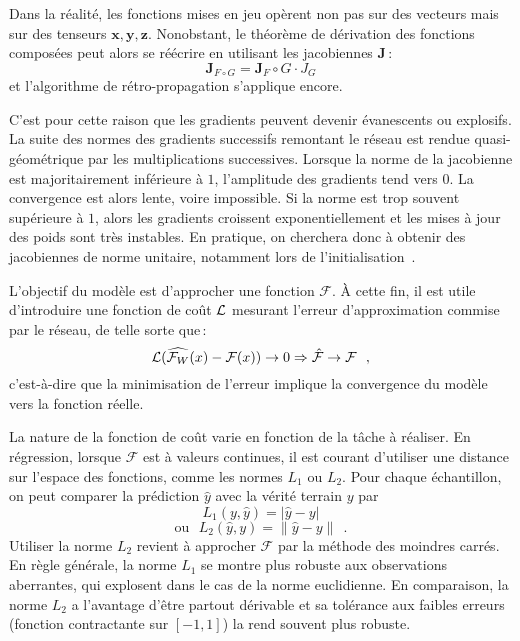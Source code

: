 Dans la réalité, les fonctions mises en jeu opèrent non pas sur des vecteurs mais sur des tenseurs $\mathbf{x}, \mathbf{y}, \mathbf{z}$. Nonobstant, le théorème de dérivation des fonctions composées peut alors se réécrire en utilisant les jacobiennes $\mathbf{J}$\,:
$$\mathbf{J}_{F \circ G} = \mathbf{J}_F \circ G \cdot J_G$$
et l'algorithme de rétro-propagation s'applique encore.

C'est pour cette raison que les gradients peuvent devenir évanescents ou explosifs. La suite des normes des gradients successifs remontant le réseau est rendue quasi-géométrique par les multiplications successives. Lorsque la norme de la jacobienne est majoritairement inférieure à $1$, l'amplitude des gradients tend vers $0$. La convergence est alors lente, voire impossible. Si la norme est trop souvent supérieure à $1$, alors les gradients croissent exponentiellement et les mises à jour des poids sont très instables. En pratique, on cherchera donc à obtenir des jacobiennes de norme unitaire, notamment lors de l'initialisation~\cite{saxe_exact_2013}.

%

L'objectif du modèle est d'approcher une fonction $\mathcal{F}$. À cette fin, il est utile d'introduire une fonction de coût $\mathcal{L}$ mesurant l'erreur d'approximation commise par le réseau, de telle sorte que\,:
$$\mathcal{L}(\widehat{\mathcal{F}_W}(x) - \mathcal{F}(x)) \rightarrow 0 \Rightarrow \hat{\mathcal{F}} \rightarrow \mathcal{F}~~,$$
c'est-à-dire que la minimisation de l'erreur implique la convergence du modèle vers la fonction réelle.

La nature de la fonction de coût varie en fonction de la tâche à réaliser. En régression, lorsque $\mathcal{F}$ est à valeurs continues, il est courant d'utiliser une distance sur l'espace des fonctions, comme les normes $L_1$ ou $L_2$. Pour chaque échantillon, on peut comparer la prédiction $\hat{y}$ avec la vérité terrain $y$ par
$$L_1(y,\hat{y}) = |\hat{y} - y|$$
$$\text{ou}~~~L_2(\hat{y},y) = \lVert \hat{y} - y \rVert~~.$$
Utiliser la norme $L_2$ revient à approcher $\mathcal{F}$ par la méthode des moindres carrés. En règle générale, la norme $L_1$ se montre plus robuste aux observations aberrantes, qui explosent dans le cas de la norme euclidienne. En comparaison, la norme $L_2$ a l'avantage d'être partout dérivable et sa tolérance aux faibles erreurs (fonction contractante sur $[-1, 1]$) la rend souvent plus robuste.


